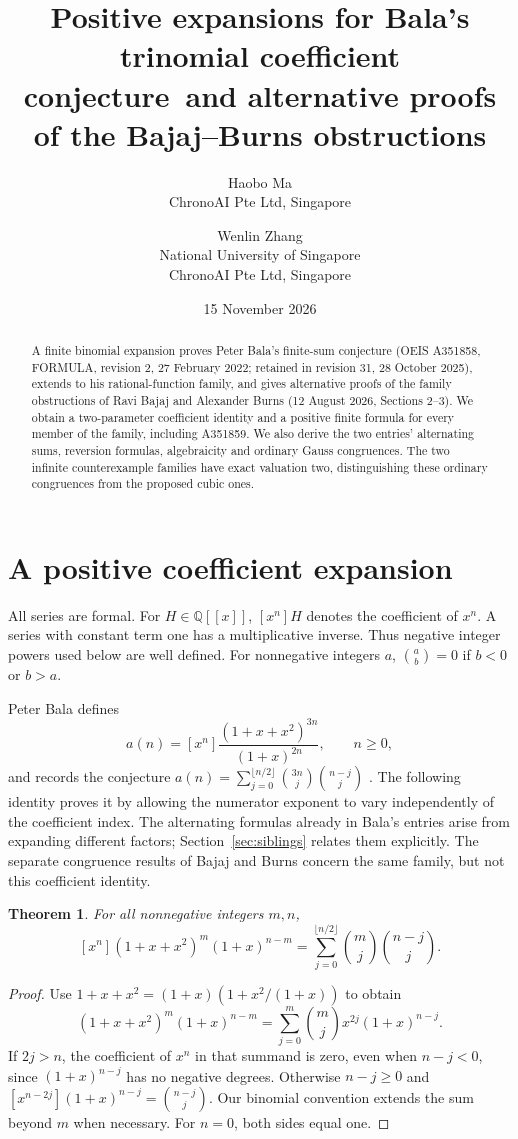 \documentclass[11pt]{article}
\title{Positive expansions for Bala's trinomial coefficient conjecture\
and alternative proofs of the Bajaj--Burns obstructions}
\author{Haobo Ma\\\small ChronoAI Pte Ltd, Singapore
\and Wenlin Zhang\\\small National University of Singapore\\\small ChronoAI Pte Ltd, Singapore}
\date{15 November 2026}
\newtheorem{theorem}{Theorem}
\begin{document}
\maketitle
\begin{abstract}
A finite binomial expansion proves Peter Bala's finite-sum conjecture
(OEIS A351858, FORMULA, revision 2, 27 February 2022; retained in revision 31,
28 October 2025), extends to his rational-function family, and gives alternative
proofs of the family obstructions of Ravi Bajaj and Alexander Burns
(12 August 2026, Sections 2--3).
We obtain a two-parameter coefficient identity and a positive finite formula
for every member of the family, including A351859. We also derive the two
entries' alternating sums, reversion formulas, algebraicity and ordinary Gauss
congruences. The two infinite counterexample families have exact valuation
two, distinguishing these ordinary congruences from the proposed cubic ones.
\end{abstract}

\section{A positive coefficient expansion}
All series are formal. For $H\in\mathbb Q[[x]]$, $[x^n]H$ denotes the
coefficient of $x^n$. A series with constant term one has a multiplicative
inverse. Thus negative integer powers used below are well defined.
For nonnegative integers $a$, $\binom ab=0$ if $b<0$ or $b>a$.

Peter Bala defines
\[
 a(n)=[x^n]\frac{(1+x+x^2)^{3n}}{(1+x)^{2n}},\qquad n\geq0,
\]
and records the conjecture
$a(n)=\sum_{j=0}^{\lfloor n/2\rfloor}\binom{3n}{j}\binom{n-j}{j}$
\cite[FORMULA]{bala2}. The following identity proves it by allowing the
numerator exponent to vary independently of the coefficient index.
The alternating formulas already in Bala's entries arise from expanding
different factors; Section~\ref{sec:siblings} relates them explicitly.
The separate congruence results of Bajaj and Burns
\cite{bbfirst,bb} concern the same family, but not this coefficient identity.

\begin{theorem}\label{thm:main}
For all nonnegative integers $m,n$,
\begin{equation}\label{eq:main}
 [x^n](1+x+x^2)^m(1+x)^{n-m}
 =\sum_{j=0}^{\lfloor n/2\rfloor}\binom mj\binom{n-j}{j}.
\end{equation}
\end{theorem}
\begin{proof}
Use $1+x+x^2=(1+x)(1+x^2/(1+x))$ to obtain
\begin{equation}\label{eq:expand}
 (1+x+x^2)^m(1+x)^{n-m}
 =\sum_{j=0}^{m}\binom mj x^{2j}(1+x)^{n-j}.
\end{equation}
If $2j>n$, the coefficient of $x^n$ in that summand is zero, even when
$n-j<0$, since $(1+x)^{n-j}$ has no negative degrees. Otherwise $n-j\geq0$
and $[x^{n-2j}](1+x)^{n-j}=\binom{n-j}{j}$.
Our binomial convention extends the sum beyond $m$ when necessary.
For $n=0$, both sides equal one.
\end{proof}
\end{document}
